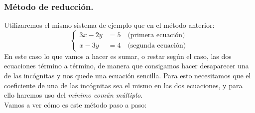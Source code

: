 \documentclass[a4paper,11pt,answers]{exam}
\begin{document}
   \subsubsection{Método de reducción.}
  Utilizaremos el mismo sistema de ejemplo que en el método anterior:
  \[\begin{cases}
      3x-2y&=5 \quad \text{(primera ecuación)}\\
      x-3y &= 4 \quad \text{(segunda ecuación)}
    \end{cases}\]
  En este caso lo que vamos a hacer es sumar, o restar según el caso, las dos ecuaciones término a término, de manera que consigamos hacer desaparecer una de las incógnitas y nos quede una ecuación sencilla. Para esto necesitamos que el coeficiente de una de las incógnitas sea el mismo en las dos ecuaciones, y para ello haremos uso del \textit{mínimo común múltiplo}.\\
  Vamos a ver cómo es este método paso a paso:
\end{document}
